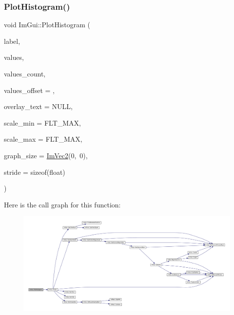 \subsubsection{\texorpdfstring{Plot\+Histogram()}{PlotHistogram()}\hspace{0.1cm}{\footnotesize\ttfamily [1/2]}}
{\footnotesize\ttfamily void Im\+Gui\+::\+Plot\+Histogram (\begin{DoxyParamCaption}\item[{const char $\ast$}]{label,  }\item[{const float $\ast$}]{values,  }\item[{int}]{values\+\_\+count,  }\item[{int}]{values\+\_\+offset = {},  }\item[{const char $\ast$}]{overlay\+\_\+text = {\ttfamily NULL},  }\item[{float}]{scale\+\_\+min = {\ttfamily FLT\+\_\+MAX},  }\item[{float}]{scale\+\_\+max = {\ttfamily FLT\+\_\+MAX},  }\item[{\mbox{\hyperlink{struct_im_vec2}{Im\+Vec2}}}]{graph\+\_\+size = {\ttfamily \mbox{\hyperlink{struct_im_vec2}{Im\+Vec2}}(0,~0)},  }\item[{int}]{stride = {\ttfamily sizeof(float)} }\end{DoxyParamCaption})}

Here is the call graph for this function\+:
\nopagebreak
\begin{figure}[H]
\begin{center}
\leavevmode
\includegraphics[width=350pt]{namespace_im_gui_af7a92b2118981835b5251bfdaac50252_cgraph}
\end{center}
\end{figure}
\mbox{\label{namespace_im_gui_af8089203baf8cf723a158c9e34bda2a4}} 
